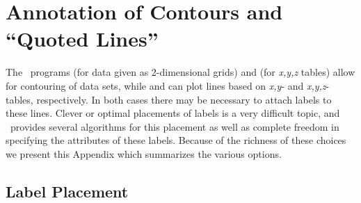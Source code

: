 %
%
\chapter{Annotation of Contours and ``Quoted Lines''}
\thispagestyle{headings}

The \GMT\ programs  (for data given as 2-dimensional grids)
and  (for {\it x,y,z} tables) allow
for contouring of data sets, while  and 
can plot lines based on {\it x,y}- and {\it x,y,z}-tables, respectively.
In both cases there may be necessary to attach labels to
these lines.  Clever or optimal placements of labels is a very difficult
topic, and \GMT\ provides several algorithms for this placement as well
as complete freedom in specifying the attributes of these labels.
Because of the richness of these choices we present this Appendix which
summarizes the various options.

\section{Label Placement}


